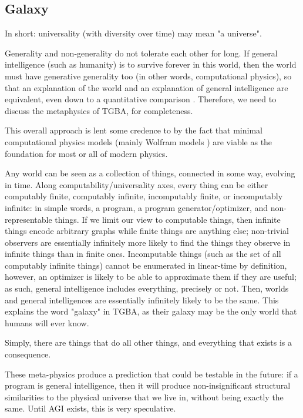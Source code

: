 \documentclass{article}
\begin{document}
\subsection{Galaxy}

In short: universality (with diversity over time) may mean "a universe".

Generality and non-generality do not tolerate each other for long. If general intelligence (such as humanity) is to survive forever in this world, then the world must have generative generality too (in other words, computational physics), so that an explanation of the world and an explanation of general intelligence are equivalent, even down to a quantitative comparison \cite{10.3389/fphy.2020.525731}. Therefore, we need to discuss the metaphysics of TGBA, for completeness.

This overall approach is lent some credence to by the fact that minimal computational physics models (mainly Wolfram models \cite{Wolfram_2020}) are viable as the foundation for most or all of modern physics.

Any world can be seen as a collection of things, connected in some way, evolving in time. Along computability/universality axes, every thing can be either computably finite, computably infinite, incomputably finite, or incomputably infinite: in simple words, a program, a program generator/optimizer, and non-representable things. If we limit our view to computable things, then infinite things encode arbitrary graphs while finite things are anything else; non-trivial observers are essentially infinitely more likely to find the things they observe in infinite things than in finite ones. Incomputable things (such as the set of all computably infinite things) cannot be enumerated in linear-time by definition, however, an optimizer is likely to be able to approximate them if they are useful; as such, general intelligence includes everything, precisely or not. Then, worlds and general intelligences are essentially infinitely likely to be the same. This explains the word "galaxy" in TGBA, as their galaxy may be the only world that humans will ever know.

Simply, there are things that do all other things, and everything that exists is a consequence.

These meta-physics produce a prediction that could be testable in the future: if a program is general intelligence, then it will produce non-insignificant structural similarities to the physical universe that we live in, without being exactly the same. Until AGI exists, this is very speculative.
\end{document}
